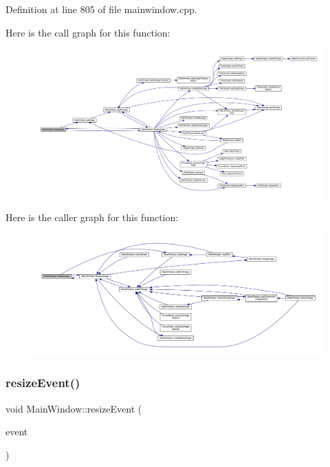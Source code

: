 Definition at line 805 of file mainwindow.\+cpp.

Here is the call graph for this function\+:
\nopagebreak
\begin{figure}[H]
\begin{center}
\leavevmode
\includegraphics[width=350pt]{class_main_window_acea9cebdcf70bf45107baa0789e732bf_cgraph}
\end{center}
\end{figure}
Here is the caller graph for this function\+:
\nopagebreak
\begin{figure}[H]
\begin{center}
\leavevmode
\includegraphics[width=350pt]{class_main_window_acea9cebdcf70bf45107baa0789e732bf_icgraph}
\end{center}
\end{figure}
\mbox{\label{class_main_window_ae12f8f63791595567b6250f8bb002bda}} 
\subsubsection{\texorpdfstring{resize\+Event()}{resizeEvent()}}
{\footnotesize\ttfamily void Main\+Window\+::resize\+Event (\begin{DoxyParamCaption}\item[{Q\+Resize\+Event $\ast$}]{event }\end{DoxyParamCaption})}

